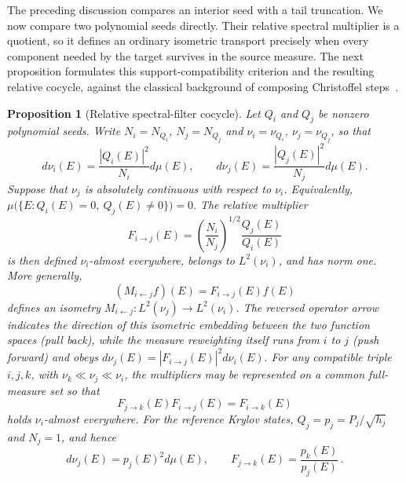 \documentclass[a4paper,11pt]{article}
\def\dd{d}%
\newtheorem{proposition}{Proposition}[section]
\theoremstyle{definition}
\theoremstyle{remark}
\newcommand{\dd}{\mathrm d}
\begin{document}
The preceding discussion compares an interior seed with a tail truncation.  We now compare
two polynomial seeds directly.  Their relative spectral multiplier is a quotient, so it defines
an ordinary isometric transport precisely when every component needed by the target survives in
the source measure.  The next proposition formulates this support-compatibility criterion and the resulting relative cocycle,
against the classical background of composing Christoffel steps~\cite{Zhedanov1997}.

\begin{proposition}[Relative spectral-filter cocycle]
\label{prop:relative-spectral-filter-cocycle}
Let $Q_i$ and $Q_j$ be nonzero polynomial seeds. Write
$N_i=N_{Q_i}$, $N_j=N_{Q_j}$ and
$\nu_i=\nu_{Q_i}$, $\nu_j=\nu_{Q_j}$, so that
\begin{equation}
   \dd\nu_i(E)=\frac{|Q_i(E)|^2}{N_i}\dd\mu(E),
   \qquad
   \dd\nu_j(E)=\frac{|Q_j(E)|^2}{N_j}\dd\mu(E).
   \label{eq:relative-cocycle-measures}
\end{equation}
Suppose that $\nu_j$ is absolutely continuous with respect to $\nu_i$. Equivalently,
$
   \mu\bigl(\{E:Q_i(E)=0,\ Q_j(E)\ne0\}\bigr)=0.
$
The relative multiplier
\begin{equation}
   F_{i\to j}(E)
   =
   \left(\frac{N_i}{N_j}\right)^{1/2}
   \frac{Q_j(E)}{Q_i(E)}
   \label{eq:relative-filter-main}
\end{equation}
is then defined $\nu_i$-almost everywhere, belongs to $L^2(\nu_i)$, and has norm one. More generally,
\begin{equation}
   (M_{i\leftarrow j}f)(E)
   =
   F_{i\to j}(E)f(E)
\end{equation}
defines an isometry
$M_{i\leftarrow j}:L^2(\nu_j)\to L^2(\nu_i)$. The reversed operator arrow indicates the direction of this isometric embedding between the two function spaces (pull back), while the measure reweighting itself runs from $i$ to $j$ (push forward) and obeys
$
   \dd\nu_j(E)=|F_{i\to j}(E)|^2\dd\nu_i(E).
$
For any compatible triple $i,j,k$, with
$\nu_k\ll\nu_j\ll\nu_i$, the multipliers may be represented on a common full-measure set so that
\begin{equation}
   F_{j\to k}(E)F_{i\to j}(E)=F_{i\to k}(E)
   \label{eq:relative-cocycle-main}
\end{equation}
holds $\nu_i$-almost everywhere. For the reference Krylov states,
$Q_j=p_j=P_j/\sqrt{h_j}$ and $N_j=1$, and hence
\begin{equation}
   \dd\nu_j(E)=p_j(E)^2\dd\mu(E),
   \qquad
   F_{j\to k}(E)=\frac{p_k(E)}{p_j(E)}\,.

\end{equation}
\end{proposition}
\end{document}
